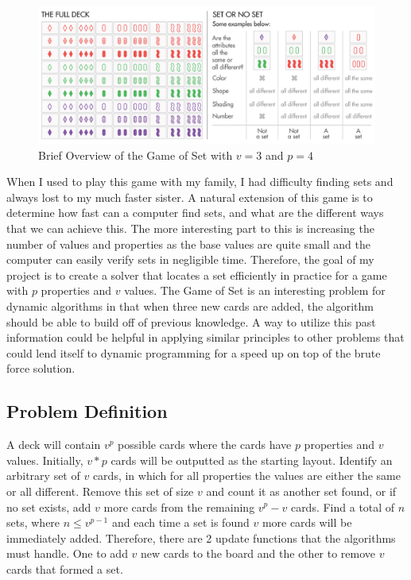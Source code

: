 \documentclass[pageno]{jpaper}
\begin{document}
\begin{figure}[htbb]
\centering
\begin{minipage}[b]{.75\linewidth}
\includegraphics[width=\linewidth]{SetOverview.png}
\caption{Brief Overview of the Game of Set with $v=3$ and $p=4$}
\label{fig:SetOverview}
\end{minipage}
\end{figure}

When I used to play this game with my family, I had difficulty finding sets and always lost to my much faster sister. A natural extension of this game is to determine how fast can a computer find sets, and what are the different ways that we can achieve this. The more interesting part to this is increasing the number of values and properties as the base values are quite small and the computer can easily verify sets in negligible time. Therefore, the goal of my project is to create a solver that locates a set efficiently in practice for a game with $p$ properties and $v$ values. The Game of Set is an interesting problem for dynamic algorithms in that when three new cards are added, the algorithm should be able to build off of previous knowledge. A way to utilize this past information could be helpful in applying similar principles to other problems that could lend itself to dynamic programming for a speed up on top of the brute force solution. 


\subsection{Problem Definition}

A deck will contain $v^p$ possible cards where the cards have $p$ properties and $v$ values. Initially, $v*p$ cards will be outputted as the starting layout. Identify an arbitrary set of $v$ cards, in which for all properties the values are either the same or all different. Remove this set of size $v$ and count it as another set found, or if no set exists, add $v$ more cards from the remaining $v^p - v$ cards. Find a total of $n$ sets, where $n \leq v^{p-1}$ and each time a set is found $v$ more cards will be immediately added. Therefore, there are 2 update functions that the algorithms must handle. One to add $v$ new cards to the board and the other to remove $v$ cards that formed a set. 
\end{document}
